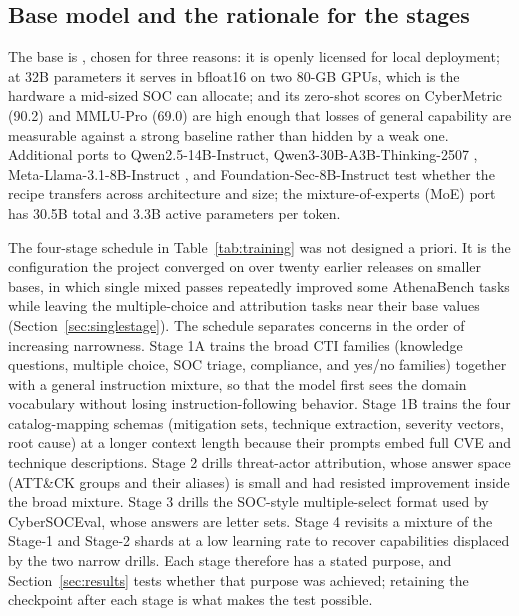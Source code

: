 \documentclass[twocolumn]{svjour3}
\newcommand{\code}[1]{\path{#1}}
\begin{document}
\subsection{Base model and the rationale for the stages}
The base is \code{Qwen/Qwen2.5-32B-Instruct} \cite{qwen2025qwen25}, chosen for three reasons: it is openly licensed for local deployment; at 32B parameters it serves in bfloat16 on two 80-GB GPUs, which is the hardware a mid-sized SOC can allocate; and its zero-shot scores on CyberMetric (90.2) and MMLU-Pro (69.0) are high enough that losses of general capability are measurable against a strong baseline rather than hidden by a weak one. Additional ports to Qwen2.5-14B-Instruct, Qwen3-30B-A3B-Thinking-2507 \cite{yang2025qwen3}, Meta-Llama-3.1-8B-Instruct \cite{grattafiori2024llama3}, and Foundation-Sec-8B-Instruct \cite{kassianik2025foundationsec} test whether the recipe transfers across architecture and size; the mixture-of-experts (MoE) port has 30.5B total and 3.3B active parameters per token.

The four-stage schedule in Table~\ref{tab:training} was not designed a priori. It is the configuration the project converged on over twenty earlier releases on smaller bases, in which single mixed passes repeatedly improved some AthenaBench tasks while leaving the multiple-choice and attribution tasks near their base values (Section~\ref{sec:singlestage}). The schedule separates concerns in the order of increasing narrowness. Stage 1A trains the broad CTI families (knowledge questions, multiple choice, SOC triage, compliance, and yes/no families) together with a general instruction mixture, so that the model first sees the domain vocabulary without losing instruction-following behavior. Stage 1B trains the four catalog-mapping schemas (mitigation sets, technique extraction, severity vectors, root cause) at a longer context length because their prompts embed full CVE and technique descriptions. Stage 2 drills threat-actor attribution, whose answer space (ATT\&CK groups and their aliases) is small and had resisted improvement inside the broad mixture. Stage 3 drills the SOC-style multiple-select format used by CyberSOCEval, whose answers are letter sets. Stage 4 revisits a mixture of the Stage-1 and Stage-2 shards at a low learning rate to recover capabilities displaced by the two narrow drills. Each stage therefore has a stated purpose, and Section~\ref{sec:results} tests whether that purpose was achieved; retaining the checkpoint after each stage is what makes the test possible.
\end{document}
